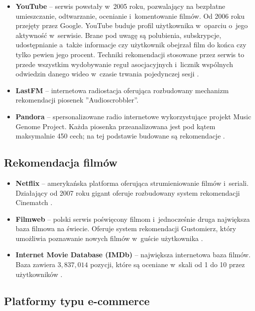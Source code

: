 \documentclass[twoside]{iisthesis}
\begin{document}
	 \begin{itemize}
	 	\item \textbf{YouTube} -- serwis powstały w~2005 roku, pozwalający na bezpłatne umieszczanie, odtwarzanie, ocenianie i~komentowanie filmów. Od 2006 roku przejęty przez Google. YouTube buduje profil użytkownika w~oparciu o~jego aktywność w~serwisie. Brane pod uwagę są polubienia, subskrypcje, udostępnianie a~także informacje czy użytkownik obejrzał film do końca czy tylko pewien jego procent. Techniki rekomendacji stosowane przez serwis to przede wszystkim wydobywanie reguł asocjacyjnych i~licznik wspólnych odwiedzin danego wideo w~czasie trwania pojedynczej sesji \cite{id:TheYouTubeVideoRecommendationSystem}. 
	 	\item \textbf{LastFM } -- internetowa radiostacja oferująca rozbudowany mechanizm rekomendacji piosenek ''Audioscrobbler''.   
	 	\item \textbf{Pandora}	-- spersonalizowane radio internetowe wykorzystujące projekt Music Genome Project. Każda piosenka przeanalizowana jest pod kątem maksymalnie 450 cech; na tej podstawie budowane są rekomendacje \cite{id:mgp}.
	 	
	 \end{itemize}
	 
	 \subsection{Rekomendacja filmów}
	 \begin{itemize}
	 	\item \textbf{Netflix} -- amerykańska platforma oferująca strumieniowanie filmów i~seriali. Działający od 2007 roku gigant oferuje rozbudowany system rekomendacji Cinematch \cite{id:aStreamOfMovies}. 
	 	\item \textbf{Filmweb} -- polski serwis poświęcony filmom i~jednocześnie druga największa baza filmowa na świecie. Oferuje system rekomendacji Gustomierz, który umożliwia poznawanie nowych filmów w~guście użytkownika \cite{id:filmwebfaq}.
	 	\item \textbf{Internet Movie Database (IMDb)} -- największa internetowa baza filmów. Baza zawiera $3,837,014$ pozycji, które są oceniane w~skali od 1 do 10 przez użytkowników \cite{id:imdbstats}.
	 \end{itemize}
	 
	 \subsection{Platformy typu e-commerce}
	 
\end{document}
